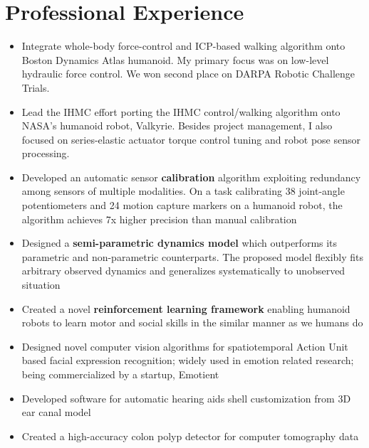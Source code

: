 \documentclass[11pt,letterpaper,sans]{moderncv}
\begin{document}
\section{Professional Experience}
	{
		\begin{itemize}
		\item Integrate whole-body force-control and ICP-based walking algorithm onto Boston Dynamics Atlas humanoid. My primary focus was on 
			low-level hydraulic force control. We won second place on DARPA Robotic Challenge Trials.
		\item Lead the IHMC effort porting the IHMC control/walking algorithm onto NASA's humanoid robot, Valkyrie. Besides
		project management, I also focused on series-elastic actuator torque control tuning and robot pose sensor processing.
		\end{itemize}
	}
	{
	  \begin{itemize}%
	  \item Developed an automatic sensor \textbf{calibration} algorithm exploiting redundancy among sensors of multiple modalities. On a task calibrating 38 joint-angle potentiometers and 24 motion capture markers on a humanoid robot, the algorithm achieves  7x higher precision than manual calibration
	  \item Designed a \textbf{semi-parametric dynamics model} which outperforms its parametric and non-parametric counterparts. The proposed model  flexibly fits arbitrary observed dynamics  and  generalizes systematically to unobserved situation 
	  \item Created a novel \textbf{reinforcement learning framework} enabling  humanoid robots to learn motor and social skills in the similar manner as we humans do
	  \end{itemize}
	}
	
	{
		\begin{itemize}
		\item Designed novel computer vision algorithms for spatiotemporal Action Unit based facial expression recognition;
		widely used in emotion related research;  being commercialized by a  startup, Emotient
		\end{itemize}
	}
	{
	  \begin{itemize}
	  \item Developed software for automatic hearing aids shell customization from 3D ear canal model
	  \item Created a high-accuracy colon polyp detector for computer tomography data
	  \end{itemize}
	  }
\end{document}
